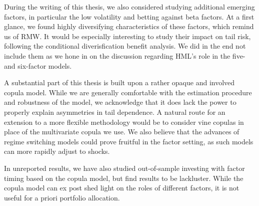 During the writing of this thesis, we also considered studying additional emerging factors, in particular the low volatility and betting against beta factors. At a first glance, we found highly diversifying characteristics of these factors, which remind us of RMW. It would be especially interesting to study their impact on tail risk, following the conditional diverisfication benefit analysis. We did in the end not include them as we hone in on the discussion regarding HML's role in the five- and six-factor models.

A substantial part of this thesis is built upon a rather opaque and involved copula model. While we are generally comfortable with the estimation procedure and robustness of the model, we acknowledge that it does lack the power to properly explain asymmetries in tail dependence. A natural route for an extension to a more flexible methodology would be to consider vine copulas in place of the multivariate copula we use. We also believe that the advances of regime switching models could prove fruitful in the factor setting, as such models can more rapidly adjust to shocks.

In unreported results, we have also studied out-of-sample investing with factor timing based on the copula model, but find results to be lackluster. While the copula model can ex post shed light on the roles of different factors, it is not useful for a priori portfolio allocation.

